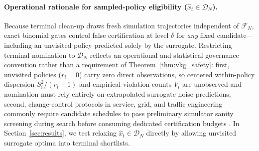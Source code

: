 \paragraph{Operational rationale for sampled-policy eligibility ($\hat{x}_t \in \mathcal{D}_N$).}
Because terminal clean-up draws fresh simulation trajectories independent of $\mathcal{F}_N$, exact binomial gates control false certification at level $\delta$ for \emph{any} fixed candidate—including an unvisited policy predicted solely by the surrogate. Restricting terminal nomination to $\mathcal{D}_N$ reflects an operational and statistical governance convention rather than a requirement of Theorem~\ref{thm:vkg_safety}: first, unvisited policies ($r_i = 0$) carry zero direct observations, so centered within-policy dispersion $S_i^2/(r_i - 1)$ and empirical violation counts $V_i$ are unobserved and nomination must rely entirely on extrapolated surrogate noise predictions; second, change-control protocols in service, grid, and traffic engineering commonly require candidate schedules to pass preliminary simulator sanity screening during search before consuming dedicated certification budgets \citep{scott2011correlated,ungredda2024bayesian}. In Section~\ref{sec:results}, we test relaxing $\hat{x}_t \in \mathcal{D}_N$ directly by allowing unvisited surrogate optima into terminal shortlists.

